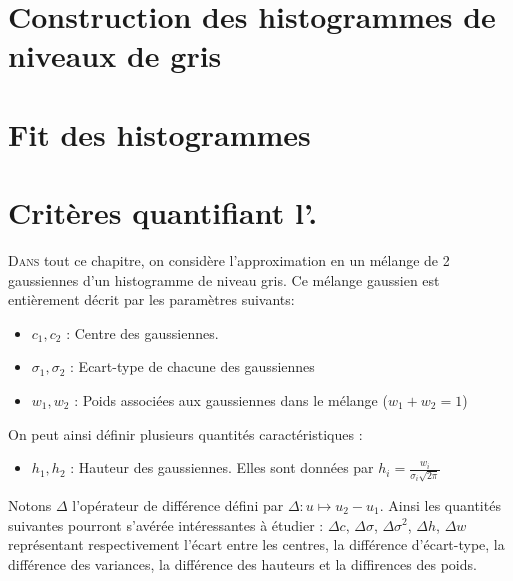 \documentclass[main.tex]{subfiles}
\begin{document}

\chapter{Construction des histogrammes de niveaux de gris}
\chapter{Fit des histogrammes}
\chapter{Critères quantifiant l'\hetero.}

\renewcommand{\LettrineFontHook}{
\fontfamily{pag}
\fontseries{bx}\fontshape{it}
}
\lettrine[lines=2, lhang=0.33, loversize=0.25]{D}{ans} 
tout ce chapitre, on considère l'approximation en un mélange de 2 gaussiennes d'un histogramme de niveau gris. Ce mélange gaussien est entièrement décrit par les paramètres suivants:
\begin{itemize}
\item $c_1, c_2$ : Centre des gaussiennes.
\item $\sigma_1,\sigma_2$ : Ecart-type de chacune des gaussiennes
\item $w_1,w_2$ : Poids associées aux gaussiennes dans le mélange ($w_1+w_2=1$)
\end{itemize}
On peut ainsi définir plusieurs quantités caractéristiques :
\begin{itemize}
\item $h_1,h_2$ : Hauteur des gaussiennes. Elles sont données par $h_i = \frac{w_i}{\sigma_i\sqrt{2\pi}}$
\end{itemize}
Notons $\Delta$ l'opérateur de différence défini par $\Delta :  u \longmapsto u_2 - u_1$. Ainsi les quantités suivantes pourront s'avérée intéressantes à étudier : $\Delta c$, $\Delta \sigma$,  $\Delta \sigma^2$, $\Delta h$, $\Delta w$ représentant respectivement l'écart entre les centres, la différence d'écart-type, la différence des variances, la différence des hauteurs et la diffirences des poids.
\end{document}
